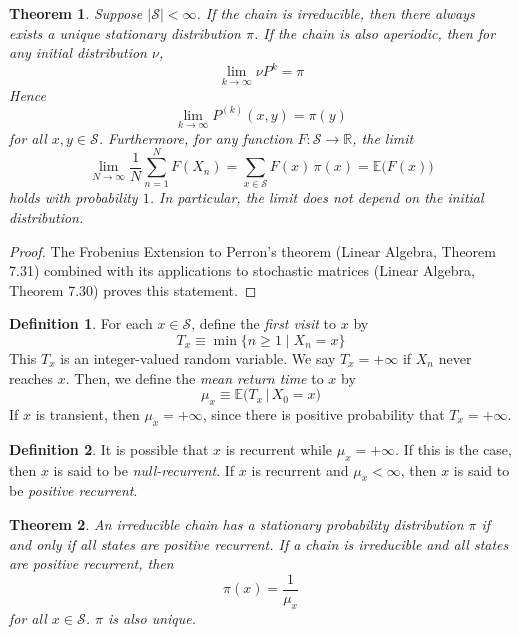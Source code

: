 \documentclass{article}
\newtheorem{theorem}{Theorem}[section]
\theoremstyle{remark}
\theoremstyle{definition}
\newtheorem{definition}{Definition}[section]
\begin{document}
\begin{theorem}
Suppose $|\mathcal{S}| < \infty$. If the chain is irreducible, then there always exists a unique stationary distribution $\pi$. If the chain is also aperiodic, then for any initial distribution $\nu$, 
\[\lim_{k \rightarrow \infty} \nu P^k = \pi \]
Hence
\[\lim_{k \rightarrow \infty} P^{(k)}(x, y) = \pi(y)\]
for all $x, y \in \mathcal{S}$. Furthermore, for any function $F: \mathcal{S} \longrightarrow \mathbb{R}$, the limit
\[\lim_{N \rightarrow \infty} \frac{1}{N} \sum_{n=1}^N F(X_n) = \sum_{x \in \mathcal{S}} F(x)\, \pi(x) = \mathbb{E} \big( F(x) \big)\]
holds with probability $1$. In particular, the limit does not depend on the initial distribution. 
\end{theorem}
\begin{proof}
The Frobenius Extension to Perron's theorem (Linear Algebra, Theorem 7.31) combined with its applications to stochastic matrices (Linear Algebra, Theorem 7.30) proves this statement. 
\end{proof}

\begin{definition}
For each $x \in \mathcal{S}$, define the \textit{first visit} to $x$ by 
\[T_x \equiv \min\{ n \geq 1 \; | \; X_n = x\}\]
This $T_x$ is an integer-valued random variable. We say $T_x = + \infty$ if $X_n$ never reaches $x$. Then, we define the \textit{mean return time} to $x$ by 
\[\mu_x \equiv \mathbb{E}\big( T_x \, | \, X_0 = x)\]
If $x$ is transient, then $\mu_x = + \infty$, since there is positive probability that $T_x = + \infty$. 
\end{definition}

\begin{definition}
It is possible that $x$ is recurrent while $\mu_x = +\infty$. If this is the case, then $x$ is said to be \textit{null-recurrent}. If $x$ is recurrent and $\mu_x < \infty$, then $x$ is said to be \textit{positive recurrent}. 
\end{definition}

\begin{theorem}
An irreducible chain has a stationary probability distribution $\pi$ if and only if all states are positive recurrent. If a chain is irreducible and all states are positive recurrent, then 
\[\pi(x) = \frac{1}{\mu_x}\]
for all $x \in \mathcal{S}$. $\pi$ is also unique. 
\end{theorem}
\end{document}
